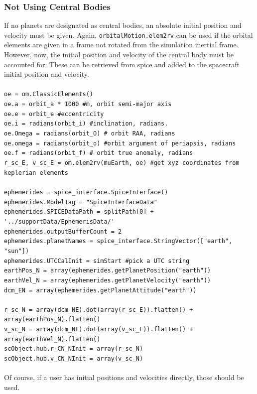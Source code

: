 \subsubsection{Not Using Central Bodies}
If no planets are designated as central bodies, an absolute initial position and velocity must be given. Again, \verb|orbitalMotion.elem2rv| can be used if the orbital elements are given in a frame not rotated from the simulation inertial frame. However, now, the initial position and velocity of the central body must be accounted for. These can be retrieved from spice and added to the spacecraft initial position and velocity.\\\\
\verb|oe = om.ClassicElements()|\\
\verb|oe.a = orbit_a * 1000 #m, orbit semi-major axis|\\
\verb|oe.e = orbit_e #eccentricity|\\
\verb|oe.i = radians(orbit_i) #inclination, radians.|\\
\verb|oe.Omega = radians(orbit_O) # orbit RAA, radians|\\
\verb|oe.omega = radians(orbit_o) #orbit argument of periapsis, radians|\\
\verb|oe.f = radians(orbit_f) # orbit true anomaly, radians|\\
\verb|r_sc_E, v_sc_E = om.elem2rv(muEarth, oe) #get xyz coordinates from keplerian elements|\\\\
\verb|ephemerides = spice_interface.SpiceInterface()|\\
\verb|ephemerides.ModelTag = "SpiceInterfaceData"|\\
\verb|ephemerides.SPICEDataPath = splitPath[0] + '../supportData/EphemerisData/'|\\
\verb|ephemerides.outputBufferCount = 2|\\
\verb|ephemerides.planetNames = spice_interface.StringVector(["earth", "sun"])|\\
\verb|ephemerides.UTCCalInit = simStart #pick a UTC string|\\
\verb|earthPos_N = array(ephemerides.getPlanetPosition("earth"))|\\
\verb|earthVel_N = array(ephemerides.getPlanetVelocity("earth"))|\\
\verb|dcm_EN = array(ephemerides.getPlanetAttitude("earth"))|\\\\
\verb|r_sc_N = array(dcm_NE).dot(array(r_sc_E)).flatten() + array(earthPos_N).flatten()|\\
\verb|v_sc_N = array(dcm_NE).dot(array(v_sc_E)).flatten() + array(earthVel_N).flatten()|\\
\verb|scObject.hub.r_CN_NInit = array(r_sc_N)|\\
\verb|scObject.hub.v_CN_NInit = array(v_sc_N)|\\\\
Of course, if a user has initial positions and velocities directly, those should be used.\\


